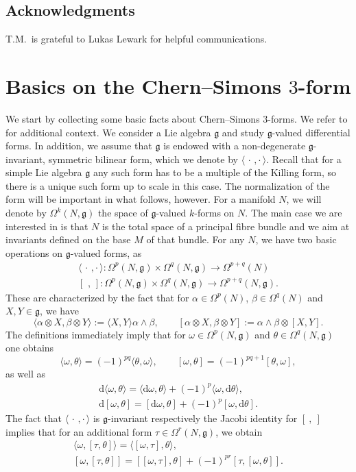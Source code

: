 \documentclass[british,11pt,a4paper]{amsart}
\numberwithin{equation}{section}
\renewcommand\frak{\mathfrak}
\newcommand{\x}{\times}
\newcommand{\al}{\alpha}
\newcommand{\be}{\beta}
\newcommand{\om}{\omega}
\renewcommand{\th}{\theta}
\newcommand{\deq}{:=}
\newcommand{\Om}{\Omega}
\newcommand{\B}[2]{\langle#1,#2\rangle}
\renewcommand*{\d}{\mathrm{d}}
\newcommand{\col}{:}
\numberwithin{theorem}{section}
\theoremstyle{definition}
\theoremstyle{remark}
\begin{document}
\subsection*{Acknowledgments} T.M.~is grateful to Lukas Lewark for helpful communications.

\section{Basics on the Chern--Simons $3$-form}\label{1}

We start by collecting some basic facts about Chern--Simons $3$-forms. We refer to
\cite{MR1337109} for additional context. We consider a Lie algebra $\mathfrak{g}$ and study
$\frak{g}$-valued differential forms. In addition, we assume that $\frak{g}$ is endowed
with a non-degenerate $\frak{g}$-invariant, symmetric bilinear form, which we denote
by $\B{\,\cdot\,}{\cdot\,}$. Recall that for a simple Lie algebra $\frak{g}$ any such form has
to be a multiple of the Killing form, so there is a unique such form up to scale in
this case. The normalization of the form will be important in what follows, 
however. For a manifold $N$, we will denote by $\Om^k(N,\frak{g})$ the space of $\frak
g$-valued $k$-forms on $N$. The main case we are interested in is that $N$ is
the total space of a principal fibre bundle and we aim at invariants defined on the
base $M$ of that bundle. For any $N$, we have two basic operations on $\frak{g}$-valued
forms, as
\begin{gather*}
\B{\,\cdot\,}{\cdot\,}\col\Om^p(N,\frak{g})\x\Om^q(N,\frak{g})\to \Om^{p+q}(N) \\
[\,\,,\,]\col\Om^p(N,\frak{g})\x\Om^q(N,\frak{g})\to \Om^{p+q}(N,\frak{g}).
\end{gather*}
These are characterized by the fact that for $\al\in\Om^p(N)$, $\be\in\Om^q(N)$ and $X,Y\in\frak{g}$, we have 
\begin{equation}\label{eq:basic-ops}
\B{\al\otimes X}{\be\otimes Y}\deq\B{X}{Y} \al\wedge\be, \qquad
[\al\otimes X,\be\otimes Y]\deq\al\wedge\be\otimes[X,Y]. 
\end{equation}
The definitions immediately imply that for $\om\in\Om^p(N,\frak{g})$ and
$\theta\in\Om^q(N,\frak{g})$ one obtains
\[
\B{\om}{\theta}=(-1)^{pq}\B{\theta}{\omega}, \qquad
[\om,\theta]=(-1)^{pq+1}[\theta,\om], 
\]
as well as
\begin{gather}
\label{eq:dB} \d\B{\om}{\theta}=\B{\d\om}{\th}+(-1)^p\B{\om}{\d\th}, \\
\label{eq:dL}  \d[\om,\th]=[\d\om,\th]+(-1)^p[\om,\d\th].
\end{gather}
The fact that $\B{\,\cdot\,}{\cdot\,}$ is $\frak{g}$-invariant respectively the Jacobi identity for $[\ ,\ ]$ implies that for an additional form
$\tau\in\Om^r(N,\frak{g})$, we obtain
\begin{gather}
\label{eq:B-invar}\B{\om}{[\tau,\th]}=\B{[\om}{\tau],\theta},\\
\label{eq:Jacobi}
[\om,[\tau,\theta]]=[[\om,\tau],\theta]+(-1)^{pr}[\tau,[\om,\theta]].
\end{gather}
\end{document}
